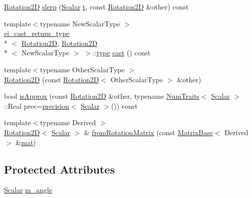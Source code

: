 \begin{DoxyCompactItemize}
\hyperlink{class_rotation2_d}{Rotation2\-D} \hyperlink{class_rotation2_d_a70afedb0b74f4ab764623bfd5bee74ca}{slerp} (\hyperlink{class_rotation2_d_a9fe0daf4c508069bf7c4b5705f89dc0c}{Scalar} \hyperlink{glext_8h_a00140d6f5c548b26daf170bf16e86a6d}{t}, const \hyperlink{class_rotation2_d}{Rotation2\-D} \&other) const 
\item 
{\footnotesize template$<$typename New\-Scalar\-Type $>$ }\\\hyperlink{structei__cast__return__type}{ei\-\_\-cast\-\_\-return\-\_\-type}\\*
$<$ \hyperlink{class_rotation2_d}{Rotation2\-D}, \hyperlink{class_rotation2_d}{Rotation2\-D}\\*
$<$ New\-Scalar\-Type $>$ $>$\-::\hyperlink{glext_8h_a7d05960f4f1c1b11f3177dc963a45d86}{type} \hyperlink{class_rotation2_d_a37ceeaf46764e627b7a7ff9ab414ac47}{cast} () const 
\item 
{\footnotesize template$<$typename Other\-Scalar\-Type $>$ }\\\hyperlink{class_rotation2_d_a58ceaf08840b4e480c381a602d094976}{Rotation2\-D} (const \hyperlink{class_rotation2_d}{Rotation2\-D}$<$ Other\-Scalar\-Type $>$ \&other)
\item 
bool \hyperlink{class_rotation2_d_a3f42e02ed2dab4f0924ad9da0ecc37ac}{is\-Approx} (const \hyperlink{class_rotation2_d}{Rotation2\-D} \&other, typename \hyperlink{struct_num_traits}{Num\-Traits}$<$ \hyperlink{class_rotation2_d_a9fe0daf4c508069bf7c4b5705f89dc0c}{Scalar} $>$\-::Real prec=\hyperlink{_math_functions_8h_a3dc1c65cf9dc9b5a7ee66472d0ae83e1}{precision}$<$ \hyperlink{class_rotation2_d_a9fe0daf4c508069bf7c4b5705f89dc0c}{Scalar} $>$()) const 
\item 
{\footnotesize template$<$typename Derived $>$ }\\\hyperlink{class_rotation2_d}{Rotation2\-D}$<$ \hyperlink{class_rotation2_d_a9fe0daf4c508069bf7c4b5705f89dc0c}{Scalar} $>$ \& \hyperlink{class_rotation2_d_a6b184ac91ccdec4a51a5225d2459fed4}{from\-Rotation\-Matrix} (const \hyperlink{class_matrix_base}{Matrix\-Base}$<$ Derived $>$ \&\hyperlink{uavobjecttemplate_8m_a16a51e808b16c46bbfd36da2e37cd123}{mat})
\end{DoxyCompactItemize}
\subsection*{Protected Attributes}
\begin{DoxyCompactItemize}
\item 
\hyperlink{class_rotation2_d_a9fe0daf4c508069bf7c4b5705f89dc0c}{Scalar} \hyperlink{class_rotation2_d_a3e2bc572b086b9f9ef56334f5d5b02e9}{m\-\_\-angle}
\end{DoxyCompactItemize}


